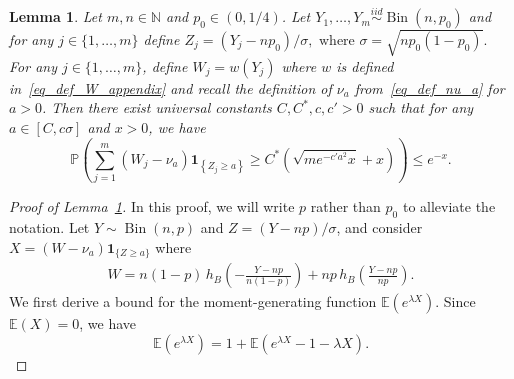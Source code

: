 \documentclass{article}
\newcommand{\one}{\mathbf{1}}
\newtheorem{lemma}{Lemma}
\begin{document}
\begin{lemma}\label{leq_truncchisq_concentration} Let $m,n \in \mathbb N$ and $p_0 \in (0,1/4)$. 
Let $Y_1,\dots, Y_m \overset{iid}{\sim} \operatorname{Bin}(n,p_0)$ and for any $j \in \{1,\dots,m\}$ define 
$Z_j = (Y_j-np_0)/\sigma, \text{ where } \sigma = \sqrt{np_0(1-p_0)}.$ 
For any $j \in \{1,\dots,m\}$, define $W_j = w(Y_j)$ where $w$ is defined in~\eqref{eq_def_W_appendix} and recall the definition of $\nu_a$ from~\eqref{eq_def_nu_a} for $a > 0$. 
Then there exist universal constants $C,C^{*}, c, c'>0$ such that for any $a\in [C,c\sigma]$ and $x>0$, we have
$$
\mathbb{P}\left(\sum_{j=1}^{m}\left(W_j-\nu_{a}\right) \one_{\left\{Z_{j} \geq a\right\}} \geq C^{*}\left(\sqrt{m e^{-c'a^2} x}+x\right)\right) \leq e^{-x}.
$$
\end{lemma}
\begin{proof}[Proof of Lemma~\ref{leq_truncchisq_concentration}]
In this proof, we will write $p$ rather than $p_0$ to alleviate the notation.  
Let $Y \sim \operatorname{Bin}(n,p)$ and $Z = (Y-np)/\sigma$, and consider $X=\left(W-\nu_{a}\right) \one_{\{Z \geq a\}}$ where
\begin{align*}
    W = n(1-p)\,h_B\!\left(-\frac{Y-np}{n(1-p)}\right) + np \,h_B\!\left(\frac{Y-np}{np}\right).
\end{align*}
We first derive a bound for the moment-generating function $\mathbb{E}\left(e^{\lambda X}\right)$. Since $\mathbb{E}(X)=0$, we have
$$
\mathbb{E}\left(e^{\lambda X}\right)=1+\mathbb{E}\left(e^{\lambda X}-1-\lambda X\right).
$$


\end{proof}
\end{document}
